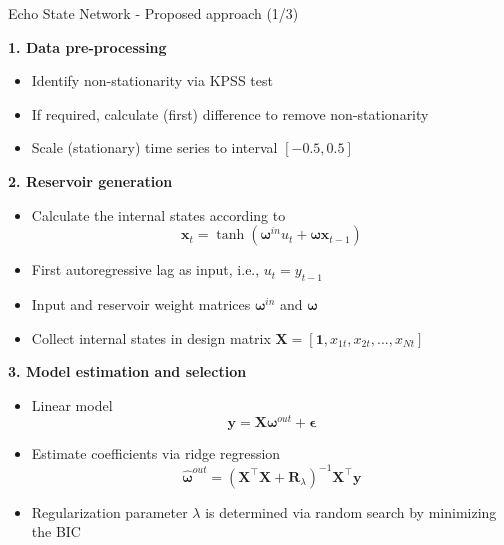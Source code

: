 \documentclass[aspectratio=169]{beamer}
\begin{document}
\begin{frame}[t]{Echo State Network - Proposed approach (1/3)}
    \begin{minipage}[t]{0.33\textwidth}
        \vspace{0pt}
        \textbf{1. Data pre-processing}
        \begin{itemize}
            \item Identify non-stationarity via KPSS test
			\item If required, calculate (first) difference to remove non-stationarity
			\item Scale (stationary) time series to interval $[-0.5, 0.5]$
        \end{itemize}
    \end{minipage}%
    \hfill
    \begin{minipage}[t]{0.33\textwidth}
        \vspace{0pt}
        \textbf{2. Reservoir generation}
        \begin{itemize}
            \item Calculate the internal states according to
				\begin{equation*}
					\mathbf{x}_{t} = \tanh \left( {\boldsymbol{\omega}^{in}} u_{t} + \boldsymbol{\omega} \mathbf{x}_{t-1} \right)
				\end{equation*}
			\item First autoregressive lag as input, i.e., $u_{t} = y_{t-1}$
			\item Input and reservoir weight matrices $\boldsymbol{\omega}^{in}$ and $\boldsymbol{\omega}$
			\item Collect internal states in design matrix $\mathbf{X} = [\mathbf{1},  x_{1t}, x_{2t}, ..., x_{Nt}]$
        \end{itemize}
    \end{minipage}
    \hfill
    \begin{minipage}[t]{0.33\textwidth}
        \vspace{0pt}
        \textbf{3. Model estimation and selection}
        \begin{itemize}
            \item Linear model
            	\begin{equation*}
            	\mathbf{y} = \mathbf{X} \boldsymbol{\omega}^{out} + \boldsymbol{\epsilon}
				\end{equation*}
			\item Estimate coefficients via ridge regression
				\begin{equation*}
				\boldsymbol{\hat{\omega}}^{out} = (\mathbf{X}^\top \mathbf{X} + \mathbf{R}_{\lambda})^{-1}\mathbf{X}^\top\mathbf{y}
				\end{equation*}
			\item Regularization parameter $\lambda$ is determined via random search by minimizing the BIC
        \end{itemize}
    \end{minipage}
\end{frame}
\end{document}
